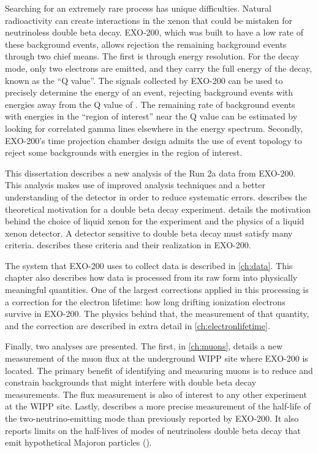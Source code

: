 \documentclass[herrin-thesis.tex]{subfiles}
\begin{document}
Searching for an extremely rare process has unique difficulties. Natural radioactivity can create interactions in the xenon that could be mistaken for neutrinoless double beta decay. EXO-200, which was built to have a low rate of these background events, allows rejection the remaining background events through two chief means. The first is through energy resolution. For the \zeronu{} decay mode, only two electrons are emitted, and they carry the full energy of the decay, known as the ``Q value''. The signals collected by EXO-200 can be used to precisely determine the energy of an event, rejecting background events with energies away from the Q value of . The remaining rate of background events with energies in the ``region of interest'' near the Q value can be estimated by looking for correlated gamma lines elsewhere in the energy spectrum. Secondly, EXO-200's time projection chamber design admits the use of event topology to reject some backgrounds with energies in the region of interest.

This dissertation describes a new analysis of the Run 2a data from EXO-200. This analysis makes use of improved analysis techniques and a better understanding of the detector in order to reduce systematic errors.  describes the theoretical motivation for a double beta decay experiment.  details the motivation behind the choice of liquid xenon for the experiment and the physics of a liquid xenon detector. A detector sensitive to double beta decay must satisfy many criteria.  describes these criteria and their realization in EXO-200.

The system that EXO-200 uses to collect data is described in \cref{ch:data}. This chapter also describes how data is processed from its raw form into physically meaningful quantities. One of the largest corrections applied in this processing is a correction for the electron lifetime: how long drifting ionization electrons survive in EXO-200. The physics behind that, the measurement of that quantity, and the correction are described in extra detail in \cref{ch:electronlifetime}.

Finally, two analyses are presented. The first, in \cref{ch:muons}, details a new measurement of the muon flux at the underground WIPP site where EXO-200 is located. The primary benefit of identifying and measuring muons is to reduce and constrain backgrounds that might interfere with double beta decay measurements. The flux measurement is also of interest to any other experiment at the WIPP site. Lastly,  describes a more precise measurement of the half-life of the two-neutrino-emitting mode than previously reported by EXO-200. It also reports limits on the half-lives of modes of neutrinoless double beta decay that emit hypothetical Majoron particles (\zeronuXpX{}).
\end{document}
